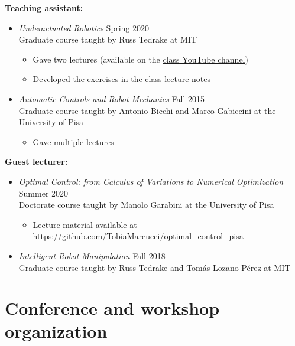 \documentclass[11pt,a4paper,sans]{moderncv}
\begin{document}
\textbf{Teaching assistant:}

\begin{itemize}

\item \textit{Underactuated  Robotics} \hfill Spring 2020 \\
Graduate course taught by Russ Tedrake at MIT
\begin{itemize}
\item
Gave two lectures (available on the  \href{https://www.youtube.com/playlist?list=PLkx8KyIQkMfX1WpWYqtep7TOmboZeDtev}{\color{cyan}class YouTube channel})
\item
Developed the exercises in the \href{http://underactuated.csail.mit.edu}{\color{cyan}class lecture notes}
\end{itemize}

\item \textit{Automatic Controls and Robot Mechanics} \hfill Fall 2015 \\
Graduate course taught by Antonio Bicchi and Marco Gabiccini at the University of Pisa
\begin{itemize}
\item
Gave multiple lectures
\end{itemize}

\end{itemize}

\textbf{Guest lecturer:}

\begin{itemize}

\item \textit{Optimal Control: from Calculus of Variations to Numerical Optimization} \hfill Summer 2020 \\
Doctorate course taught by Manolo Garabini at the University of Pisa
\begin{itemize}
\item
Lecture material available at \href{https://github.com/TobiaMarcucci/optimal_control_pisa}{\color{cyan}https://github.com/TobiaMarcucci/optimal\_control\_pisa}
\end{itemize}

\item \textit{Intelligent Robot Manipulation} \hfill Fall 2018 \\
Graduate course taught by Russ Tedrake and Tom\'{a}s Lozano-P\'{e}rez at MIT

\end{itemize}


\section{Conference and workshop organization}
\end{document}
